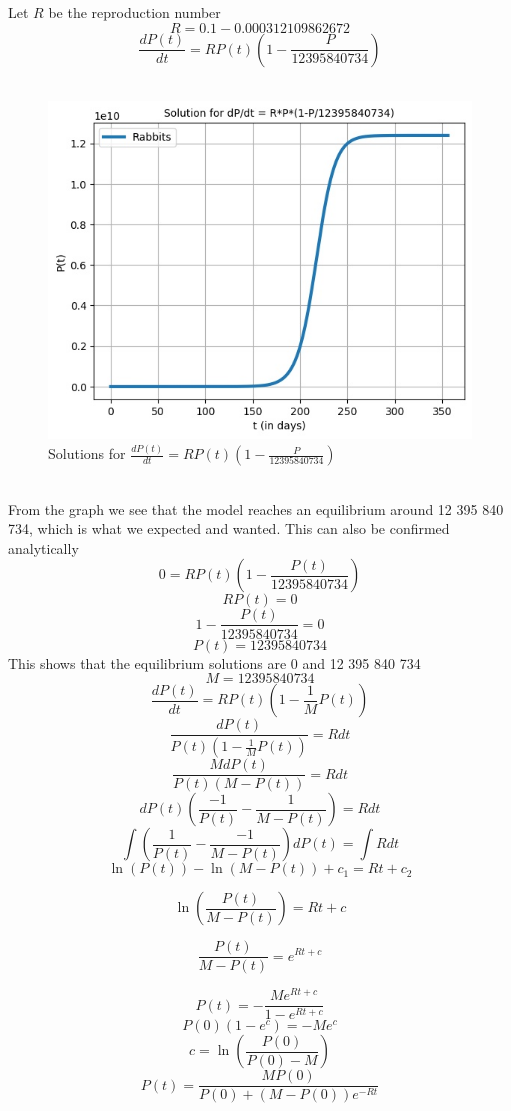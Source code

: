 \documentclass{article}
\begin{document}
Let $R$ be the reproduction number
$$
R = 0.1 - 0.000312109862672
$$
$$
\frac{dP(t)}{dt} = RP(t)(1-\frac{P}{12 395 840 734})
$$
\\
\begin{figure}[hb]
	\centering
	\includegraphics[scale=0.6]{Pictures/logis}
	\caption{Solutions for $\frac{dP(t)}{dt} = RP(t)(1-\frac{P}{12 395 840 734})$ }
	\label{fig:unr_rabbitts}
\end{figure}
\\
From the graph we see that the model reaches an equilibrium around 12 395 840 734, which is what we expected and wanted. This can also be confirmed analytically 
$$
0= RP(t)(1-\frac{P(t)}{12 395 840 734})
$$
$$
RP(t) = 0
$$
$$
1-\frac{P(t)}{12 395 840 734} = 0
$$
$$
P(t) = 12 395 840 734
$$
This shows that the equilibrium solutions are 0 and 12 395 840 734
$$
M = 12 395 840 734 
$$
$$
\frac{dP(t)}{dt} = RP(t)(1 - \frac{1}{M}P(t))
$$
$$
\frac{dP(t)}{P(t)(1 - \frac{1}{M}P(t))} = Rdt
$$
$$
\frac{MdP(t)}{P(t)(M - P(t))} = Rdt
$$
$$
dP(t)(\frac{-1}{P(t)} - \frac{1}{M -P(t)})   = Rdt
$$
$$
\int{(\frac{1}{P(t)} - \frac{-1}{M -P(t)})dP(t) }  =\int{ R}dt
$$
$$
\ln(P(t)) - \ln(M -P(t)) + c_1 = Rt +c_2
$$

$$
 \ln(\frac{P(t)}{M -P(t)})  = Rt +c
$$

$$
\frac{P(t)}{M -P(t)}= e^{Rt +c}
$$

$$
P(t) = - \frac{Me^{Rt +c}}{1 - e^{Rt +c}}
$$
$$
P(0)(1 - e^{c}) = -Me^{c}
$$
$$
c = \ln(\frac{P(0)}{P(0)-M})
$$
$$
P(t) =  \frac{MP(0)}{P(0)+(M - P(0))e^{-Rt}}
$$
\end{document}
